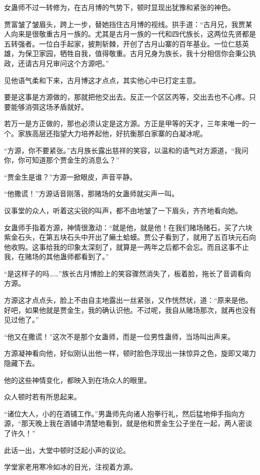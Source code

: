 \begin{this_body}
女蛊师不过一转修为，在古月博的气势下，顿时显现出犹豫和紧张的神色。

贾富皱了皱眉头，跨上一步，替她挡住古月博的视线。拱手道：“古月兄，我贾某人向来是很敬重古月一族的。尤其是古月一族的一代和四代族长，这两位先贤都是五转强者。一位白手起家，披荆斩棘，开创了古月山寨的百年基业。一位仁慈英雄，为保卫家园，牺牲自我，值得敬重。古月兄身为族长，我十分相信你会秉公执政，还请古月兄审问这个方源吧。”

见他语气柔和下来，古月博这才点点，其实他心中已打定主意。

要是这事是方源做的，那就把他交出去。反正一个区区丙等，交出去也不心疼。只要能够消弭这场矛盾就好。

若万一是方正做的，那也必须认定是这方源。方正是甲等的天才，三年来唯一的一个。家族高层还指望大力培养起他，好抗衡那白家寨的白凝冰呢。

“方源，你不要紧张。”古月族长露出慈祥的笑容，以温和的语气对方源道，“我问你，你可知道那个贾金生的消息么？”

“贾金生是谁？”方源一掀眼皮，声音平静。

“他撒谎！”方源话音刚落，那赌场的女蛊师就尖声一叫。

议事堂的众人，听着这尖锐的叫声，都不由地皱了一下眉头，齐齐地看向她。

女蛊师手指着方源，神情很激动：“就是他，就是他！在我们赌场赌石，买了六块紫金石头，在第五块石头中开出了癞土蛤蟆。贾公子看到了，就用了五百块元石向他收购。这事给我的印象太深刻了，就算是一两年之后都不会忘。而且这事不止我，在赌场的其他蛊师都看到了。”

“是这样子的吗……”族长古月博脸上的笑容骤然消失了，板着脸，拖长了音调看向方源。

方源这才点点头，脸上不由自主地露出一丝紧张，又作恍然状，道：“原来是他。好吧，如果他就是贾金生，我的确认识他。不过呢，我自从赌场那次，就再也没有见过他了。”

“他又在撒谎！”这次不是那个女蛊师，而是一位男性蛊师，当场叫出声来。

方源凝神看向他，好似刚认出他一样，顿时脸色浮现出一抹惊异之色，旋即又竭力隐藏下去。

他的这些神情变化，都映入到在场众人的眼里。

众人顿时若有所思起来。

“诸位大人，小的在酒铺工作。”男蛊师先向诸人抱拳行礼，然后猛地伸手指向方源，“那天晚上我在酒铺中清楚地看到，就是他和贾金生公子坐在一起，两人密谈了许久！”

此话一出，大堂中顿时泛起小声的议论。

学堂家老用寒冷如冰的目光，注视着方源。


\end{this_body}
